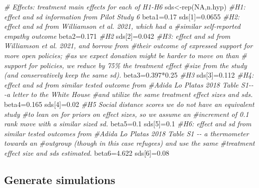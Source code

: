\documentclass[
]{article}
\newenvironment{Shaded}{\begin{snugshade}}{\end{snugshade}}
\newcommand{\CommentTok}[1]{\textcolor[rgb]{0.56,0.35,0.01}{\textit{#1}}}
\newcommand{\ConstantTok}[1]{\textcolor[rgb]{0.00,0.00,0.00}{#1}}
\newcommand{\DecValTok}[1]{\textcolor[rgb]{0.00,0.00,0.81}{#1}}
\newcommand{\FloatTok}[1]{\textcolor[rgb]{0.00,0.00,0.81}{#1}}
\newcommand{\FunctionTok}[1]{\textcolor[rgb]{0.00,0.00,0.00}{#1}}
\newcommand{\NormalTok}[1]{#1}
\newcommand{\OtherTok}[1]{\textcolor[rgb]{0.56,0.35,0.01}{#1}}
\newcommand{\SpecialCharTok}[1]{\textcolor[rgb]{0.00,0.00,0.00}{#1}}
\begin{document}
\begin{Shaded}
\begin{Highlighting}[]
\CommentTok{\# Effects: treatment main effects for each of H1{-}H6}
\NormalTok{  sds}\OtherTok{\textless{}{-}}\FunctionTok{rep}\NormalTok{(}\ConstantTok{NA}\NormalTok{,n.hyp)}
  \CommentTok{\#H1: effect and sd information from Pilot Study 6}
\NormalTok{  beta1}\OtherTok{=}\FloatTok{0.17} 
\NormalTok{  sds[}\DecValTok{1}\NormalTok{]}\OtherTok{=}\FloatTok{0.0655}
  \CommentTok{\#H2: effect and sd from Williamson et al. 2021, which had a }
    \CommentTok{\#similar self{-}reported empathy outcome}
\NormalTok{  beta2}\OtherTok{=}\FloatTok{0.171} \CommentTok{\#H2}
\NormalTok{  sds[}\DecValTok{2}\NormalTok{]}\OtherTok{=}\FloatTok{0.042}
  \CommentTok{\#H3: effect and sd from Williamson et al. 2021, and borrow from }
    \CommentTok{\#their outcome of expressed support for more open policies; }
    \CommentTok{\#as we expect donation might be harder to move on than }
    \CommentTok{\# support for policies, we reduce by 75\% the treatment effect }
    \CommentTok{\#size from the study (and conservatively keep the same sd).}
\NormalTok{  beta3}\OtherTok{=}\FloatTok{0.397}\SpecialCharTok{*}\FloatTok{0.25} \CommentTok{\#H3}
\NormalTok{  sds[}\DecValTok{3}\NormalTok{]}\OtherTok{=}\FloatTok{0.112}
  \CommentTok{\#H4: effect and sd from similar tested outcome from }
    \CommentTok{\#Adida Lo Platas 2018 Table S1{-}{-}{-}a letter to the White House}
    \CommentTok{\#and utilize the same treatment effect sizes and sds. }
\NormalTok{  beta4}\OtherTok{=}\FloatTok{0.165}
\NormalTok{  sds[}\DecValTok{4}\NormalTok{]}\OtherTok{=}\FloatTok{0.02}
  \CommentTok{\#H5 Social distance scores we do not have an equivalent study}
    \CommentTok{\#to lean on for priors on effect sizes, so we assume an }
    \CommentTok{\#increment of 0.1 rank move with a similar sized sd.}
\NormalTok{  beta5}\OtherTok{=}\FloatTok{0.1}
\NormalTok{  sds[}\DecValTok{5}\NormalTok{]}\OtherTok{=}\FloatTok{0.1}
  \CommentTok{\#H6: effect and sd from similar tested outcomes from }
    \CommentTok{\#Adida Lo Platas 2018 Table S1 {-}{-} a thermometer towards an }
    \CommentTok{\#outgroup (though in this case refugees) and use the same }
    \CommentTok{\#treatment effect size and sds estimated.}
\NormalTok{  beta6}\OtherTok{=}\FloatTok{4.622}
\NormalTok{  sds[}\DecValTok{6}\NormalTok{]}\OtherTok{=}\FloatTok{0.08}
\end{Highlighting}
\end{Shaded}

\hypertarget{generate-simulations}{%
\subsection{Generate simulations}\label{generate-simulations}}
\end{document}
